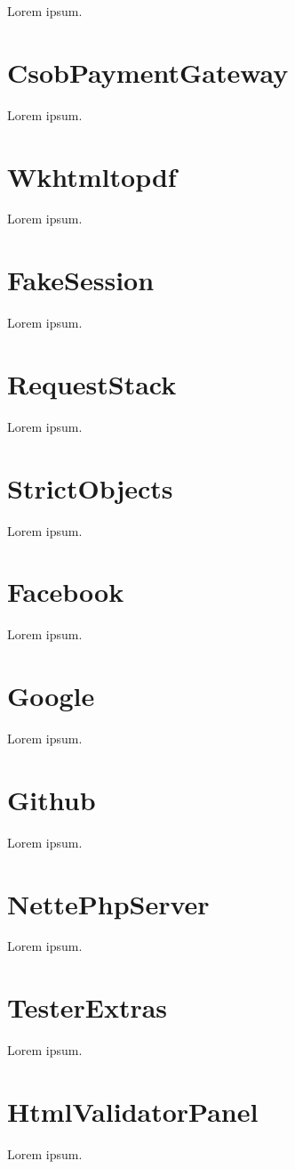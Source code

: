Lorem ipsum.

\section{CsobPaymentGateway}

Lorem ipsum.

\section{Wkhtmltopdf}

Lorem ipsum.

\section{FakeSession}

Lorem ipsum.

\section{RequestStack}

Lorem ipsum.

\section{StrictObjects}

Lorem ipsum.

\section{Facebook}

Lorem ipsum.

\section{Google}

Lorem ipsum.

\section{Github}

Lorem ipsum.

\section{NettePhpServer}

Lorem ipsum.

\section{TesterExtras}

Lorem ipsum.

\section{HtmlValidatorPanel}

Lorem ipsum.
